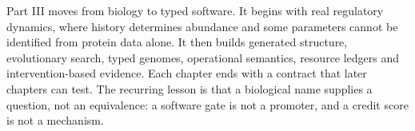 Part III moves from biology to typed software. It begins with real regulatory dynamics, where history determines abundance and some parameters cannot be identified from protein data alone. It then builds generated structure, evolutionary search, typed genomes, operational semantics, resource ledgers and intervention-based evidence. Each chapter ends with a contract that later chapters can test. The recurring lesson is that a biological name supplies a question, not an equivalence: a software gate is not a promoter, and a credit score is not a mechanism.
